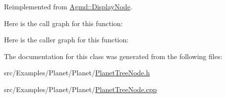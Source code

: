 Reimplemented from \hyperlink{class_agmd_1_1_display_node_ad82e625239b3c31f56a650703894e99e}{Agmd\+::\+Display\+Node}.



Here is the call graph for this function\+:




Here is the caller graph for this function\+:




The documentation for this class was generated from the following files\+:\begin{DoxyCompactItemize}
\item 
src/\+Examples/\+Planet/\+Planet/\hyperlink{_planet_tree_node_8h}{Planet\+Tree\+Node.\+h}\item 
src/\+Examples/\+Planet/\+Planet/\hyperlink{_planet_tree_node_8cpp}{Planet\+Tree\+Node.\+cpp}\end{DoxyCompactItemize}
